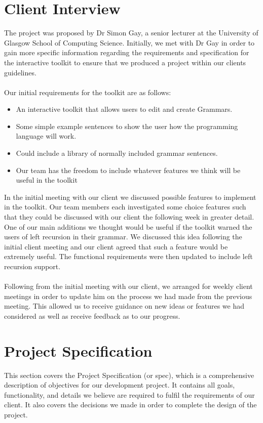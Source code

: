 \documentclass{l3proj}
\begin{document}
\section{Client Interview}
The project was proposed by Dr Simon Gay, a senior lecturer at the University of Glasgow School of Computing Science. Initially, we met with Dr Gay in order to gain more specific information regarding the requirements and specification for the interactive toolkit to ensure that we produced a project within our clients guidelines.\\
\\
Our initial requirements for the toolkit are as follows:
\begin{itemize}
	\item An interactive toolkit that allows users to edit and create Grammars.
	\item Some simple example sentences to show the user how the programming language will work.
	\item Could include a library of normally included grammar sentences.
	\item Our team has the freedom to include whatever features we think will be useful in the toolkit
\end{itemize}

In the initial meeting with our client we discussed possible features to implement in the toolkit. Our team members each investigated some choice features such that they could be discussed with our client the following week in greater detail. One of our main additions we thought would be useful if the toolkit warned the users of left recursion in their grammar. We discussed this idea following the initial client meeting and our client agreed that such a feature would be extremely useful. The functional requirements were then updated to include left recursion support.\\
\\
Following from the initial meeting with our client, we arranged for weekly client meetings in order to update him on the process we had made from the previous meeting. This allowed us to receive guidance on new ideas or features we had considered as well as receive feedback as to our progress. 

\section{Project Specification}
This section covers the Project Specification (or spec), which is a comprehensive description of objectives for our development project. It contains all goals, functionality, and details we believe are required to fulfil the requirements of our client. It also covers the decisions we made in order to complete the design of the project. \\
\\
\end{document}
